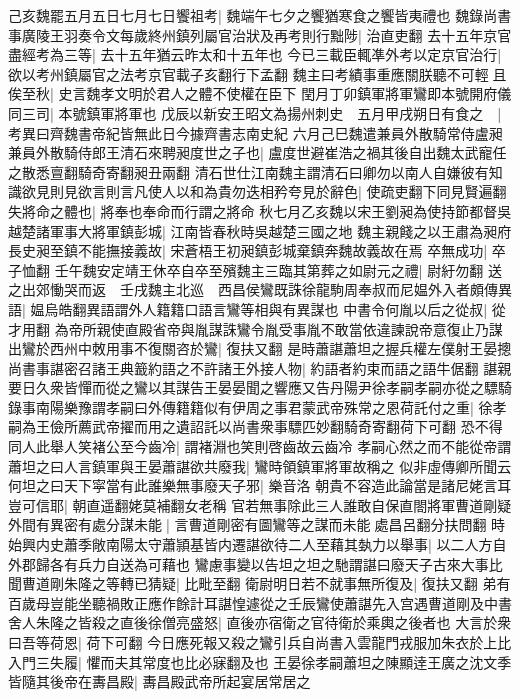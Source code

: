 己亥魏罷五月五日七月七日饗祖考|{
	魏端午七夕之饗猶寒食之饗皆夷禮也}
魏錄尚書事廣陵王羽奏令文每歲終州鎮列屬官治狀及再考則行黜陟|{
	治直吏翻}
去十五年京官盡經考為三等|{
	去十五年猶云昨太和十五年也}
今已三載臣輒凖外考以定京官治行|{
	欲以考州鎮屬官之法考京官載子亥翻行下孟翻}
魏主曰考績事重應關朕聽不可輕且俟至秋|{
	史言魏孝文明於君人之體不使權在臣下}
閏月丁卯鎮軍將軍鸞即本號開府儀同三司|{
	本號鎮軍將軍也}
戊辰以新安王昭文為揚州刺史　五月甲戌朔日有食之　|{
	考異曰齊魏書帝紀皆無此日今據齊書志南史紀}
六月己巳魏遣兼員外散騎常侍盧昶兼員外散騎侍郎王清石來聘昶度世之子也|{
	盧度世避崔浩之禍其後自出魏太武寵任之散悉亶翻騎奇寄翻昶丑兩翻}
清石世仕江南魏主謂清石曰卿勿以南人自嫌彼有知識欲見則見欲言則言凡使人以和為貴勿迭相矜夸見於辭色|{
	使疏吏翻下同見賢遍翻}
失將命之體也|{
	將奉也奉命而行謂之將命}
秋七月乙亥魏以宋王劉昶為使持節都督吳越楚諸軍事大將軍鎮彭城|{
	江南皆春秋時吳越楚三國之地}
魏主親餞之以王肅為昶府長史昶至鎮不能撫接義故|{
	宋蒼梧王初昶鎮彭城棄鎮奔魏故義故在焉}
卒無成功|{
	卒子恤翻}
壬午魏安定靖王休卒自卒至殯魏主三臨其第葬之如尉元之禮|{
	尉紆勿翻}
送之出郊慟哭而返　壬戌魏主北巡　西昌侯鸞既誅徐龍駒周奉叔而尼媪外入者頗傳異語|{
	媪烏皓翻異語謂外人籍籍口語言鸞等相與有異謀也}
中書令何胤以后之從叔|{
	從才用翻}
為帝所親使直殿省帝與胤謀誅鸞令胤受事胤不敢當依違諫說帝意復止乃謀出鸞於西州中敇用事不復關咨於鸞|{
	復扶又翻}
是時蕭諶蕭坦之握兵權左僕射王晏摠尚書事諶密召諸王典籖約語之不許諸王外接人物|{
	約語者約束而語之語牛倨翻}
諶親要日久衆皆憚而從之鸞以其謀告王晏晏聞之響應又告丹陽尹徐孝嗣孝嗣亦從之驃騎錄事南陽樂豫謂孝嗣曰外傳籍籍似有伊周之事君蒙武帝殊常之恩荷託付之重|{
	徐孝嗣為王儉所薦武帝擢而用之遺詔託以尚書衆事驃匹妙翻騎奇寄翻荷下可翻}
恐不得同人此舉人笑褚公至今齒冷|{
	謂褚淵也笑則啓齒故云齒冷}
孝嗣心然之而不能從帝謂蕭坦之曰人言鎮軍與王晏蕭諶欲共廢我|{
	鸞時領鎮軍將軍故稱之}
似非虛傳卿所聞云何坦之曰天下寜當有此誰樂無事廢天子邪|{
	樂音洛}
朝貴不容造此論當是諸尼姥言耳豈可信耶|{
	朝直遥翻姥莫補翻女老稱}
官若無事除此三人誰敢自保直閤將軍曹道剛疑外間有異密有處分謀未能|{
	言曹道剛密有圖鸞等之謀而未能處昌呂翻分扶問翻}
時始興内史蕭季敞南陽太守蕭頴基皆内遷諶欲待二人至藉其埶力以舉事|{
	以二人方自外郡歸各有兵力自送為可藉也}
鸞慮事變以告坦之坦之馳謂諶曰廢天子古來大事比聞曹道剛朱隆之等轉已猜疑|{
	比毗至翻}
衛尉明日若不就事無所復及|{
	復扶又翻}
弟有百歲母豈能坐聽禍敗正應作餘計耳諶惶遽從之壬辰鸞使蕭諶先入宫遇曹道剛及中書舍人朱隆之皆殺之直後徐僧亮盛怒|{
	直後亦宿衛之官待衛於乘輿之後者也}
大言於衆曰吾等荷恩|{
	荷下可翻}
今日應死報又殺之鸞引兵自尚書入雲龍門戎服加朱衣於上比入門三失履|{
	懼而夫其常度也比必寐翻及也}
王晏徐孝嗣蕭坦之陳顯逹王廣之沈文季皆隨其後帝在夀昌殿|{
	夀昌殿武帝所起宴居常居之}
